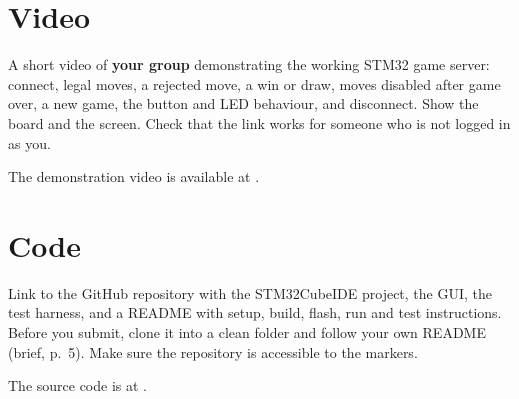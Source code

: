\section{Video}
\label{sec:video}

\begin{guidance}
A short video of \textbf{your group} demonstrating the working STM32 game
server: connect, legal moves, a rejected move, a win or draw, moves disabled
after game over, a new game, the button and LED behaviour, and disconnect.
Show the board and the screen. Check that the link works for someone who is
not logged in as you.
\end{guidance}

The demonstration video is available at .

\section{Code}
\label{sec:code}

\begin{guidance}
Link to the GitHub repository with the STM32CubeIDE project, the GUI, the test
harness, and a README with setup, build, flash, run and test instructions.
Before you submit, clone it into a clean folder and follow your own README
(brief, p.~5). Make sure the repository is accessible to the markers.
\end{guidance}

The source code is at . 

